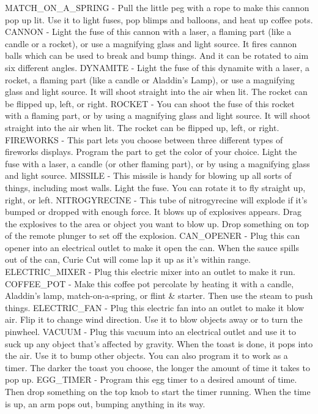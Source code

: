 MATCH_ON_A_SPRING - Pull the little peg with a rope to make this cannon pop up lit. Use it to light fuses, pop blimps and balloons, and heat up coffee pots.
CANNON - Light the fuse of this cannon with a laser, a flaming part (like a candle or a rocket), or use a magnifying glass and light source. It fires cannon balls which can be used to break and bump things. And it can be rotated to aim six different angles.
DYNAMITE - Light the fuse of this dynamite with a laser, a rocket, a flaming part (like a candle or Aladdin's Lamp), or use a magnifying glass and light source. It will shoot straight into the air when lit. The rocket can be flipped up, left, or right.
ROCKET - You can shoot the fuse of this rocket with a flaming part, or by using a magnifying glass and light source. It will shoot straight into the air when lit. The rocket can be flipped up, left, or right.
FIREWORKS - This part lets you choose between three different types of fireworks displays. Program the part to get the color of your choice. Light the fuse with a laser, a candle (or other flaming part), or by using a magnifying glass and light source.
MISSILE - This missile is handy for blowing up all sorts of things, including most walls. Light the fuse. You can rotate it to fly straight up, right, or left.
NITROGYRECINE - This tube of nitrogyrecine will explode if it's bumped or dropped with enough force. It blows up of explosives appears. Drag the explosives to the area or object you want to blow up. Drop something on top of the remote plunger to set off the explosion.
CAN_OPENER - Plug this can opener into an electrical outlet to make it open the can. When the sauce spills out of the can, Curie Cut will come lap it up as it's within range.
ELECTRIC_MIXER - Plug this electric mixer into an outlet to make it run.
COFFEE_POT - Make this coffee pot percolate by heating it with a candle, Aladdin's lamp, match-on-a-spring, or flint & starter. Then use the steam to push things.
ELECTRIC_FAN - Plug this electric fan into an outlet to make it blow air. Flip it to change wind direction. Use it to blow objects away or to turn the pinwheel.
VACUUM - Plug this vacuum into an electrical outlet and use it to suck up any object that's affected by gravity. When the toast is done, it pops into the air. Use it to bump other objects. You can also program it to work as a timer. The darker the toast you choose, the longer the amount of time it takes to pop up.
EGG_TIMER - Program this egg timer to a desired amount of time. Then drop something on the top knob to start the timer running. When the time is up, an arm pops out, bumping anything in its way.

